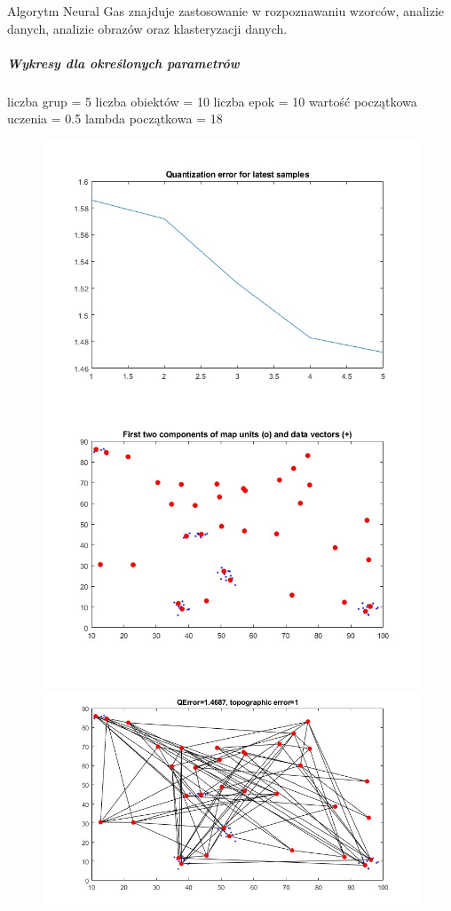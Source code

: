 \documentclass[11pt]{article}
\begin{document}
Algorytm Neural Gas znajduje zastosowanie w rozpoznawaniu wzorców,
analizie danych, analizie obrazów oraz klasteryzacji danych.

\hypertarget{wykresy-dla-okreux15blonych-parametruxf3w-4}{%
\subparagraph{Wykresy dla określonych
parametrów}\label{wykresy-dla-okreux15blonych-parametruxf3w-4}}

liczba grup = 5 liczba obiektów = 10 liczba epok = 10 wartość początkowa
uczenia = 0.5 lambda początkowa = 18

\begin{figure}[h!]
  \includegraphics{screeny/NeuralGas/Neural_gasp_5_groups/Neural_gasp_learning_process.jpg}
  \includegraphics{screeny/NeuralGas/Neural_gasp_5_groups/Neural_gasp_Graph.jpg}

\end{figure}
\end{document}

